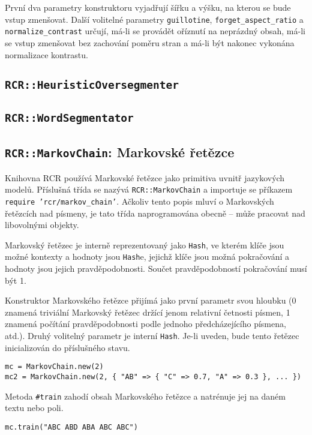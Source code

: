 \documentclass[a4paper]{article}
\begin{document}
První dva parametry konstruktoru vyjadřují šířku a výšku, na kterou se bude
vstup zmenšovat. Další volitelné parametry \texttt{guillotine},
\texttt{forget\_aspect\_ratio} a \texttt{normalize\_contrast} určují, má-li
se provádět oříznutí na neprázdný obsah, má-li se vstup zmenšovat bez zachování
poměru stran a má-li být nakonec vykonána normalizace kontrastu.

\subsection{\texttt{RCR::HeuristicOversegmenter}}

\subsection{\texttt{RCR::WordSegmentator}}

\subsection{\texttt{RCR::MarkovChain}: Markovské řetězce}
Knihovna RCR používá Markovské řetězce jako primitiva uvnitř jazykových modelů.
Příslušná třída se nazývá \texttt{RCR::MarkovChain} a importuje se příkazem
\texttt{require 'rcr/markov\_chain'}. Ačkoliv tento popis mluví o Markovských
řetězcích nad písmeny, je tato třída naprogramována obecně -- může pracovat nad
libovolnými objekty.

Markovský řetězec je interně reprezentovaný jako \texttt{Hash}, ve kterém klíče
jsou možné kontexty a hodnoty jsou \texttt{Hash}e, jejichž klíče jsou možná
pokračování a hodnoty jsou jejich pravděpodobnosti. Součet pravděpodobností
pokračování musí být 1.

Konstruktor Markovského řetězce přijímá jako první parametr svou hloubku (0
znamená triviální Markovský řetězec držící jenom relativní četnosti písmen, 1
znamená počítání pravděpodobnosti podle jednoho předcházejícího písmena, atd.).
Druhý volitelný parametr je interní \texttt{Hash}. Je-li uveden, bude tento
řetězec inicializován do příslušného stavu.
\begin{lstlisting}
mc = MarkovChain.new(2)
mc2 = MarkovChain.new(2, { "AB" => { "C" => 0.7, "A" => 0.3 }, ... })
\end{lstlisting}

Metoda \texttt{\#train} zahodí obsah Markovského řetězce a natrénuje jej na
daném textu nebo poli.
\begin{lstlisting}
mc.train("ABC ABD ABA ABC ABC")
\end{lstlisting}
\end{document}
